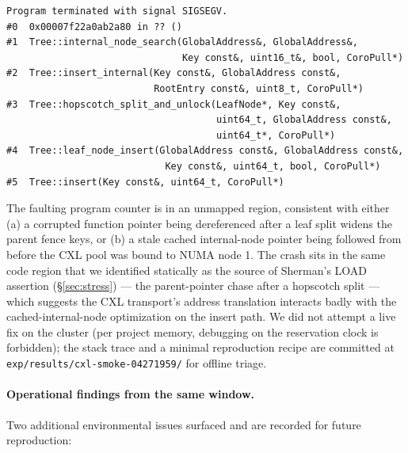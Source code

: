 \documentclass[11pt,a4paper]{article}
\begin{document}
\begin{lstlisting}[basicstyle=\ttfamily\scriptsize]
Program terminated with signal SIGSEGV.
#0  0x00007f22a0ab2a80 in ?? ()
#1  Tree::internal_node_search(GlobalAddress&, GlobalAddress&,
                               Key const&, uint16_t&, bool, CoroPull*)
#2  Tree::insert_internal(Key const&, GlobalAddress const&,
                          RootEntry const&, uint8_t, CoroPull*)
#3  Tree::hopscotch_split_and_unlock(LeafNode*, Key const&,
                                     uint64_t, GlobalAddress const&,
                                     uint64_t*, CoroPull*)
#4  Tree::leaf_node_insert(GlobalAddress const&, GlobalAddress const&,
                            Key const&, uint64_t, bool, CoroPull*)
#5  Tree::insert(Key const&, uint64_t, CoroPull*)
\end{lstlisting}

The faulting program counter is in an unmapped region, consistent with either (a) a corrupted function pointer being dereferenced after a leaf split widens the parent fence keys, or (b) a stale cached internal-node pointer being followed from before the CXL pool was bound to NUMA node 1. The crash sits in the same code region that we identified statically as the source of Sherman's LOAD assertion (\S\ref{sec:stress}) --- the parent-pointer chase after a hopscotch split --- which suggests the CXL transport's address translation interacts badly with the cached-internal-node optimization on the insert path. We did not attempt a live fix on the cluster (per project memory, debugging on the reservation clock is forbidden); the stack trace and a minimal reproduction recipe are committed at \texttt{exp/results/cxl-smoke-04271959/} for offline triage.

\paragraph{Operational findings from the same window.} Two additional environmental issues surfaced and are recorded for future reproduction:
\end{document}
